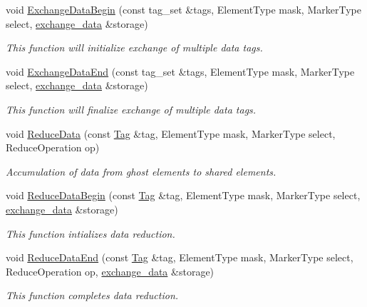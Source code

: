 \begin{DoxyCompactItemize}
void \hyperlink{classINMOST_1_1Mesh_a418d72493b24344d247b811bd980b3a9}{Exchange\-Data\-Begin} (const tag\-\_\-set \&tags, Element\-Type mask, Marker\-Type select, \hyperlink{classINMOST_1_1Mesh_1_1exchange__data}{exchange\-\_\-data} \&storage)
\begin{DoxyCompactList}\small\item\em This function will initialize exchange of multiple data tags. \end{DoxyCompactList}\item 
void \hyperlink{classINMOST_1_1Mesh_aa49bac8c58e4e610eb4c7ec7dd9f4b96}{Exchange\-Data\-End} (const tag\-\_\-set \&tags, Element\-Type mask, Marker\-Type select, \hyperlink{classINMOST_1_1Mesh_1_1exchange__data}{exchange\-\_\-data} \&storage)
\begin{DoxyCompactList}\small\item\em This function will finalize exchange of multiple data tags. \end{DoxyCompactList}\item 
void \hyperlink{classINMOST_1_1Mesh_a2d488479041917c975b1e662d642c4a5}{Reduce\-Data} (const \hyperlink{classINMOST_1_1Tag}{Tag} \&tag, Element\-Type mask, Marker\-Type select, Reduce\-Operation op)
\begin{DoxyCompactList}\small\item\em Accumulation of data from ghost elements to shared elements. \end{DoxyCompactList}\item 
void \hyperlink{classINMOST_1_1Mesh_a0597bf77b8438dc79bf791912a2b34d2}{Reduce\-Data\-Begin} (const \hyperlink{classINMOST_1_1Tag}{Tag} \&tag, Element\-Type mask, Marker\-Type select, \hyperlink{classINMOST_1_1Mesh_1_1exchange__data}{exchange\-\_\-data} \&storage)
\begin{DoxyCompactList}\small\item\em This function intializes data reduction. \end{DoxyCompactList}\item 
void \hyperlink{classINMOST_1_1Mesh_aa8273226d8ab6e54baba5db22107df37}{Reduce\-Data\-End} (const \hyperlink{classINMOST_1_1Tag}{Tag} \&tag, Element\-Type mask, Marker\-Type select, Reduce\-Operation op, \hyperlink{classINMOST_1_1Mesh_1_1exchange__data}{exchange\-\_\-data} \&storage)
\begin{DoxyCompactList}\small\item\em This function completes data reduction. \end{DoxyCompactList}\item 

\end{DoxyCompactItemize}
